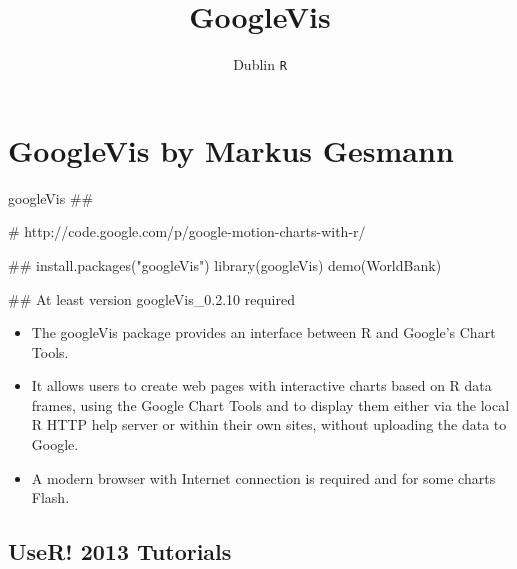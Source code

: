 \documentclass[]{article}
\title{GoogleVis}
\author{Dublin \texttt{R}}
\begin{document}
\maketitle

\begin{abstract}

\end{abstract}

\section{GoogleVis by Markus Gesmann}



googleVis
##

# http://code.google.com/p/google-motion-charts-with-r/

##
install.packages("googleVis")
library(googleVis) 
demo(WorldBank)

## At least version googleVis_0.2.10 required

\begin{itemize}
\item The googleVis package provides an interface between R and Google's Chart Tools. 

\item It allows users to create web pages with interactive charts based on R data frames, using the Google Chart Tools and to 
display them either via the local R HTTP help server or within their own sites, without uploading the data to Google. 

\item A modern browser with Internet connection is required and for some charts Flash.
\end{itemize}
\subsection{UseR! 2013 Tutorials}
\end{document}
